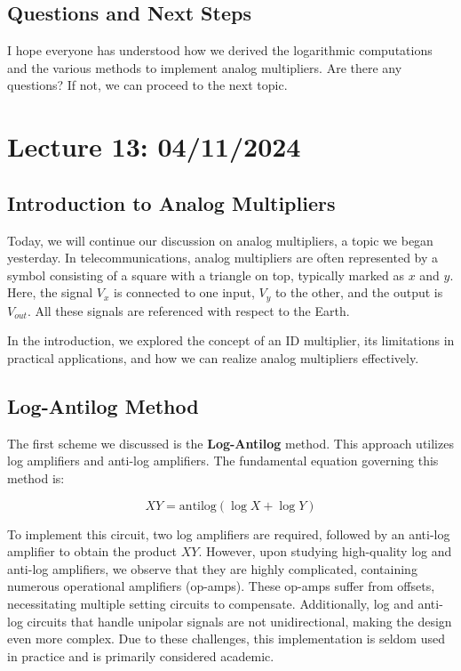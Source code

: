 \subsection*{Questions and Next Steps}

I hope everyone has understood how we derived the logarithmic computations and the various methods to implement analog multipliers. Are there any questions? If not, we can proceed to the next topic.
\newpage

\section{Lecture 13: 04/11/2024}

\subsection{Introduction to Analog Multipliers}

Today, we will continue our discussion on analog multipliers, a topic we began yesterday. In telecommunications, analog multipliers are often represented by a symbol consisting of a square with a triangle on top, typically marked as \( x \) and \( y \). Here, the signal \( V_x \) is connected to one input, \( V_y \) to the other, and the output is \( V_{out} \). All these signals are referenced with respect to the Earth.

In the introduction, we explored the concept of an ID multiplier, its limitations in practical applications, and how we can realize analog multipliers effectively.

\subsection{Log-Antilog Method}

The first scheme we discussed is the \textbf{Log-Antilog} method. This approach utilizes log amplifiers and anti-log amplifiers. The fundamental equation governing this method is:

\[
XY = \text{antilog}(\log X + \log Y)
\]

To implement this circuit, two log amplifiers are required, followed by an anti-log amplifier to obtain the product \( XY \). However, upon studying high-quality log and anti-log amplifiers, we observe that they are highly complicated, containing numerous operational amplifiers (op-amps). These op-amps suffer from offsets, necessitating multiple setting circuits to compensate. Additionally, log and anti-log circuits that handle unipolar signals are not unidirectional, making the design even more complex. Due to these challenges, this implementation is seldom used in practice and is primarily considered academic.

